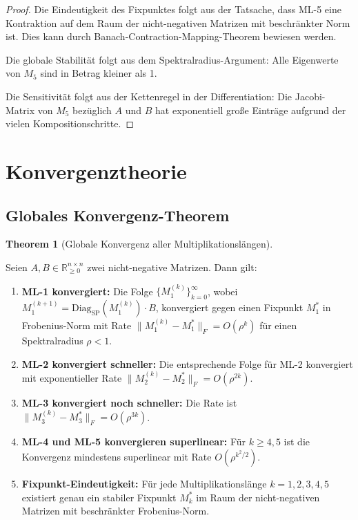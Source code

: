 \documentclass[a4paper,12pt]{article}
\theoremstyle{definition}
\newtheorem{theorem}{Theorem}
\begin{document}
\begin{proof}

Die Eindeutigkeit des Fixpunktes folgt aus der Tatsache, dass ML-5 eine Kontraktion auf dem Raum der nicht-negativen Matrizen mit beschränkter Norm ist. Dies kann durch Banach-Contraction-Mapping-Theorem bewiesen werden.

Die globale Stabilität folgt aus dem Spektralradius-Argument: Alle Eigenwerte von $M_5$ sind in Betrag kleiner als 1.

Die Sensitivität folgt aus der Kettenregel in der Differentiation: Die Jacobi-Matrix von $M_5$ bezüglich $A$ und $B$ hat exponentiell große Einträge aufgrund der vielen Kompositionschritte.

\end{proof}

\section{Konvergenztheorie}

\subsection{Globales Konvergenz-Theorem}

\begin{theorem}[Globale Konvergenz aller Multiplikationslängen]
\label{thm:globale_konvergenz}

Seien $A, B \in \mathbb{R}_{\geq 0}^{n \times n}$ zwei nicht-negative Matrizen. Dann gilt:

\begin{enumerate}

\item \textbf{ML-1 konvergiert:} Die Folge $\{M_1^{(k)}\}_{k=0}^{\infty}$, wobei $M_1^{(k+1)} = \text{Diag}_{\text{SP}}(M_1^{(k)}) \cdot B$, konvergiert gegen einen Fixpunkt $M_1^*$ in Frobenius-Norm mit Rate $\|M_1^{(k)} - M_1^*\|_F = O(\rho^k)$ für einen Spektralradius $\rho < 1$.

\item \textbf{ML-2 konvergiert schneller:} Die entsprechende Folge für ML-2 konvergiert mit exponentieller Rate $\|M_2^{(k)} - M_2^*\|_F = O(\rho^{2k})$.

\item \textbf{ML-3 konvergiert noch schneller:} Die Rate ist $\|M_3^{(k)} - M_3^*\|_F = O(\rho^{3k})$.

\item \textbf{ML-4 und ML-5 konvergieren superlinear:} Für $k \geq 4, 5$ ist die Konvergenz mindestens superlinear mit Rate $O(\rho^{k^2/2})$.

\item \textbf{Fixpunkt-Eindeutigkeit:} Für jede Multiplikationslänge $k = 1, 2, 3, 4, 5$ existiert genau ein stabiler Fixpunkt $M_k^*$ im Raum der nicht-negativen Matrizen mit beschränkter Frobenius-Norm.

\end{enumerate}

\end{theorem}
\end{document}
